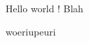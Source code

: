 \documentclass[11pt,twoside,a4paper]{article}
\begin{document}
Hello world !
Blah

woeriupeuri
\end{document}
